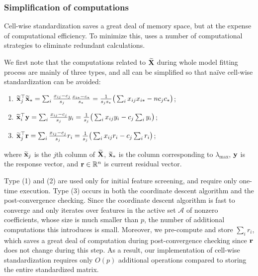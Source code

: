 \subsubsection{Simplification of computations}

Cell-wise standardization saves a great deal of memory space, but at the expense of computational efficiency. To minimize this,  uses a number of computational strategies to eliminate redundant calculations.

We first note that the computations related to $\widetilde{\mathbf{X}}$ during whole model fitting process are mainly of three types, and all can be simplified so that na\"ive cell-wise standardization can be avoided: 
\begin{enumerate}[(1)]
\item $\widetilde{\mathbf{x}}_j^\top \widetilde{\mathbf{x}}_* = \sum_i \frac{x_{ij} - c_j}{s_j} \frac{x_{i*} -c_*}{s_*} = \frac{1}{s_j s_*} \big( \sum_i x_{ij} x_{i*} - n c_j c_* \big)$; \label{simp1}
\item $\widetilde{\mathbf{x}}_i^\top \mathbf{y} = \sum_i \frac{x_{ij} - c_j}{s_j} y_i  = \frac{1}{s_j} \big( \sum_i x_{ij} y_i - c_j  \sum_i y_i\big)$; \label{simp2}
\item $\widetilde{\mathbf{x}}_j^\top \mathbf{r} = \sum_i \frac{x_{ij} - c_j}{s_j} r_i = \frac{1}{s_j} \big(\sum_i x_{ij} r_i - c_j \sum_i r_i \big)$; \label{simp3}
\end{enumerate}
where $\widetilde{\mathbf{x}}_j$ is the $j$th column of $\widetilde{\mathbf{X}}$, $\widetilde{\mathbf{x}}_*$ is the column corresponding to $\lambda_{\max}$, $\mathbf{y}$ is the response vector, and $\mathbf{r} \in \mathbb{R}^n$ is current residual vector.

Type (1) and (2) are used only for initial feature screening, and require only one-time execution. Type (3) occurs in both the coordinate descent algorithm and the post-convergence checking. Since the coordinate descent algorithm is fast to converge and only iterates over features in the active set $\mathcal{A}$ of nonzero coefficients, whose size is much smaller than $p$, the number of additional computations this introduces is small. Moreover, we pre-compute and store $\sum_i r_i$, which saves a great deal of computation during post-convergence checking since $\mathbf{r}$ does not change during this step. As a result, our implementation of cell-wise standardization requires only $O(p)$ additional operations compared to storing the entire standardized matrix.

